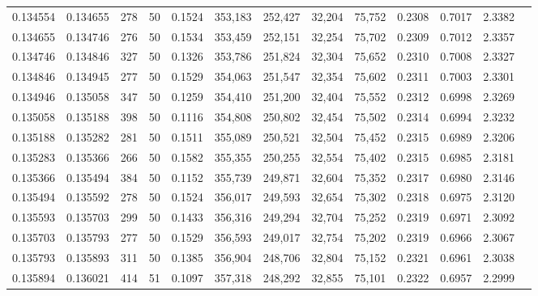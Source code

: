 \begin{tabular}{rrrrrrrrrrrrr}
0.134554 & 0.134655 &   278 &  50 &                                     0.1524 & 353,183 & 252,427 &  32,204 &  75,752 & 0.2308 & 0.7017 & 2.3382 \\
0.134655 & 0.134746 &   276 &  50 &                                     0.1534 & 353,459 & 252,151 &  32,254 &  75,702 & 0.2309 & 0.7012 & 2.3357 \\
0.134746 & 0.134846 &   327 &  50 &                                     0.1326 & 353,786 & 251,824 &  32,304 &  75,652 & 0.2310 & 0.7008 & 2.3327 \\
0.134846 & 0.134945 &   277 &  50 &                                     0.1529 & 354,063 & 251,547 &  32,354 &  75,602 & 0.2311 & 0.7003 & 2.3301 \\
0.134946 & 0.135058 &   347 &  50 &                                     0.1259 & 354,410 & 251,200 &  32,404 &  75,552 & 0.2312 & 0.6998 & 2.3269 \\
0.135058 & 0.135188 &   398 &  50 &                                     0.1116 & 354,808 & 250,802 &  32,454 &  75,502 & 0.2314 & 0.6994 & 2.3232 \\
0.135188 & 0.135282 &   281 &  50 &                                     0.1511 & 355,089 & 250,521 &  32,504 &  75,452 & 0.2315 & 0.6989 & 2.3206 \\
0.135283 & 0.135366 &   266 &  50 &                                     0.1582 & 355,355 & 250,255 &  32,554 &  75,402 & 0.2315 & 0.6985 & 2.3181 \\
0.135366 & 0.135494 &   384 &  50 &                                     0.1152 & 355,739 & 249,871 &  32,604 &  75,352 & 0.2317 & 0.6980 & 2.3146 \\
0.135494 & 0.135592 &   278 &  50 &                                     0.1524 & 356,017 & 249,593 &  32,654 &  75,302 & 0.2318 & 0.6975 & 2.3120 \\
0.135593 & 0.135703 &   299 &  50 &                                     0.1433 & 356,316 & 249,294 &  32,704 &  75,252 & 0.2319 & 0.6971 & 2.3092 \\
0.135703 & 0.135793 &   277 &  50 &                                     0.1529 & 356,593 & 249,017 &  32,754 &  75,202 & 0.2319 & 0.6966 & 2.3067 \\
0.135793 & 0.135893 &   311 &  50 &                                     0.1385 & 356,904 & 248,706 &  32,804 &  75,152 & 0.2321 & 0.6961 & 2.3038 \\
0.135894 & 0.136021 &   414 &  51 &                                     0.1097 & 357,318 & 248,292 &  32,855 &  75,101 & 0.2322 & 0.6957 & 2.2999 \\

\end{tabular}
